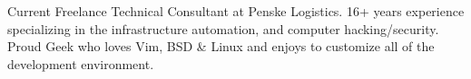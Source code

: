 

\begin{cvparagraph}

Current Freelance Technical Consultant at Penske Logistics. 16+ years experience specializing in the infrastructure automation, and computer hacking/security. Proud Geek who loves Vim, BSD \& Linux and enjoys to customize all of the development environment. 
\end{cvparagraph}
